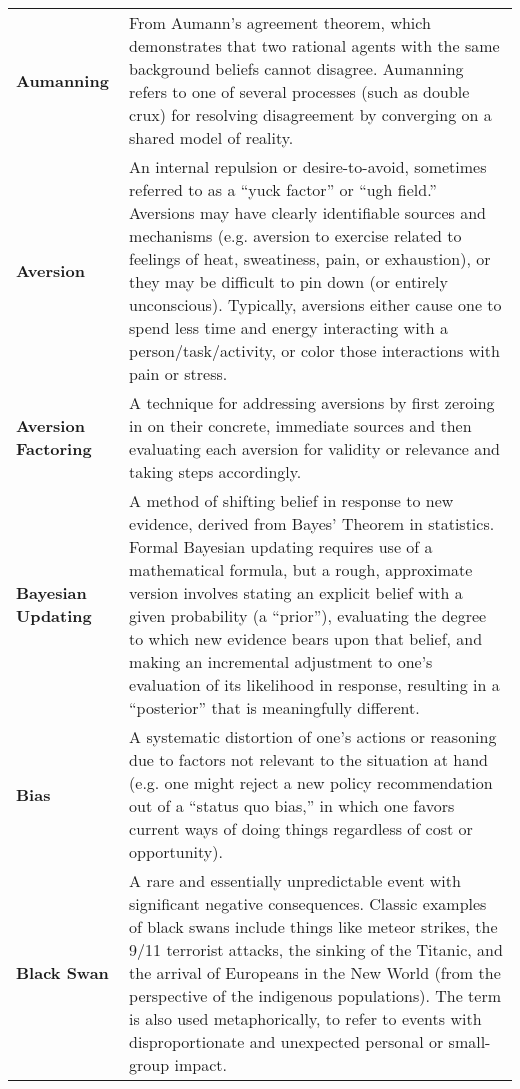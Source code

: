 \begin{longtable} { p{} p{} }
\textbf{Aumanning} & From Aumann's agreement theorem, which demonstrates that two rational agents with the same background beliefs cannot disagree.  Aumanning refers to one of several processes (such as double crux) for resolving disagreement by converging on a shared model of reality.\\

\textbf{Aversion} & An internal repulsion or desire-to-avoid, sometimes referred to as a ``yuck factor'' or ``ugh field.''  Aversions may have clearly identifiable sources and mechanisms (e.g. aversion to exercise related to feelings of heat, sweatiness, pain, or exhaustion), or they may be difficult to pin down (or entirely unconscious).  Typically, aversions either cause one to spend less time and energy interacting with a person/task/activity, or color those interactions with pain or stress.\\

\textbf{Aversion Factoring} & A technique for addressing aversions by first zeroing in on their concrete, immediate sources and then evaluating each aversion for validity or relevance and taking steps accordingly.\\

\textbf{Bayesian Updating} & A method of shifting belief in response to new evidence, derived from Bayes' Theorem in statistics.  Formal Bayesian updating requires use of a mathematical formula, but a rough, approximate version involves stating an explicit belief with a given probability (a ``prior''), evaluating the degree to which new evidence bears upon that belief, and making an incremental adjustment to one's evaluation of its likelihood in response, resulting in a ``posterior'' that is meaningfully different.\\

\textbf{Bias} & A systematic distortion of one's actions or reasoning due to factors not relevant to the situation at hand (e.g. one might reject a new policy recommendation out of a ``status quo bias,'' in which one favors current ways of doing things regardless of cost or opportunity).\\

\textbf{Black Swan} & A rare and essentially unpredictable event with significant negative consequences.  Classic examples of black swans include things like meteor strikes, the 9/11 terrorist attacks, the sinking of the Titanic, and the arrival of Europeans in the New World (from the perspective of the indigenous populations).  The term is also used metaphorically, to refer to events with disproportionate and unexpected personal or small-group impact.\\


\end{longtable}
